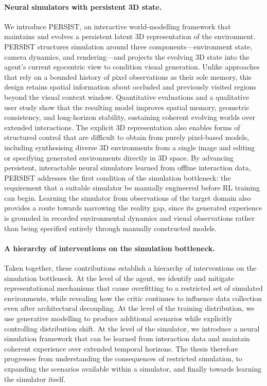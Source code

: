 \paragraph{Neural simulators with persistent 3D state.}
We introduce \hbox{PERSIST}, an interactive world-modelling framework that maintains and evolves a persistent latent 3D representation of the environment. PERSIST structures simulation around three components---environment state, camera dynamics, and rendering---and projects the evolving 3D state into the agent's current egocentric view to condition visual generation. Unlike approaches that rely on a bounded history of pixel observations as their sole memory, this design retains spatial information about occluded and previously visited regions beyond the visual context window. Quantitative evaluations and a qualitative user study show that the resulting model improves spatial memory, geometric consistency, and long-horizon stability, sustaining coherent evolving worlds over extended interactions. The explicit 3D representation also enables forms of structured control that are difficult to obtain from purely pixel-based models, including synthesising diverse 3D environments from a single image and editing or specifying generated environments directly in 3D space. By advancing persistent, interactable neural simulators learned from offline interaction data, PERSIST addresses the first condition of the simulation bottleneck: the requirement that a suitable simulator be manually engineered before RL training can begin. Learning the simulator from observations of the target domain also provides a route towards narrowing the reality gap, since its generated experience is grounded in recorded environmental dynamics and visual observations rather than being specified entirely through manually constructed models.

\paragraph{A hierarchy of interventions on the simulation bottleneck.}
Taken together, these contributions establish a hierarchy of interventions on the simulation bottleneck. At the level of the agent, we identify and mitigate representational mechanisms that cause overfitting to a restricted set of simulated environments, while revealing how the critic continues to influence data collection even after architectural decoupling. At the level of the training distribution, we use generative modelling to produce additional scenarios while explicitly controlling distribution shift. At the level of the simulator, we introduce a neural simulation framework that can be learned from interaction data and maintain coherent experience over extended temporal horizons. The thesis therefore progresses from understanding the consequences of restricted simulation, to expanding the scenarios available within a simulator, and finally towards learning the simulator itself.

